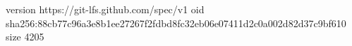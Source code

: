 version https://git-lfs.github.com/spec/v1
oid sha256:88cb77c96a3e8b1ee27267f2fdbd8fc32eb06e07411d2c0a002d82d37c9bf610
size 4205

